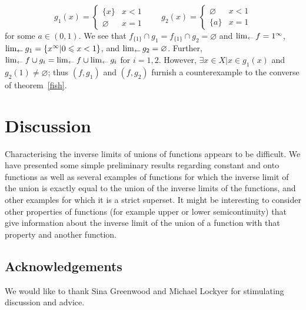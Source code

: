 \documentclass{article}
\theoremstyle{definition}
\let\emptyset\varnothing
\begin{document}
\begin{equation}
  g_1(x) = \begin{cases}
    \lbrace x\rbrace & x<1\\
    \emptyset & x=1
  \end{cases}
\qquad
  g_2(x) = \begin{cases}
    \emptyset & x<1\\
    \lbrace a\rbrace & x=1
  \end{cases}
\end{equation}
for some $a\in(0,1)$.  We see that $
f_{\lbrace 1\rbrace}\cap g_{1}=
f_{\lbrace 1\rbrace}\cap g_{2}
=\emptyset$
and $\lim_{\leftarrow} f=1^\infty$,
$\lim_{\leftarrow} g_1=\lbrace x^\infty | 0\leqslant x< 1\rbrace$, and
$\invlim{g_2}=\emptyset$.  Further, $\lim_{\leftarrow} f\cup
  g_i=\lim_{\leftarrow} f\cup\lim_{\leftarrow} g_i$ for $i=1,2$.  However, $\exists
x\in X|x\in g_1(x)$ and $g_2(1)\neq\emptyset$; thus $(f,g_1)$ and
$(f,g_2)$ furnish a counterexample to the converse of
theorem~\ref{fish}.

\section{Discussion}

Characterising the inverse limits of unions of functions appears to be
difficult.  We have presented some simple preliminary results
regarding constant and onto functions as well as several examples of
functions for which the inverse limit of the union is exactly equal to
the union of the inverse limits of the functions, and other examples
for which it is a strict superset.  It might be interesting to
consider other properties of functions (for example upper or lower
semicontinuity) that give information about the inverse limit of the
union of a function with that property and another function.

\subsection*{Acknowledgements}
We would like to thank Sina Greenwood and Michael Lockyer for
stimulating discussion and advice.



\end{document}
